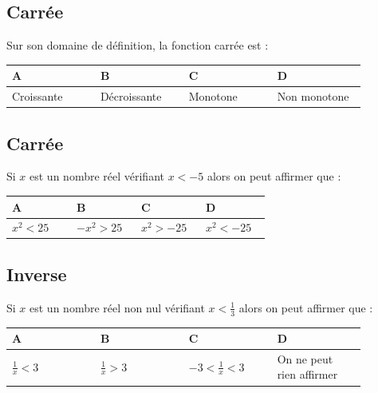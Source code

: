\documentclass[oneside,12pt]{article}
\begin{document}
\subsection{Carrée}
Sur son domaine de définition, la fonction carrée est :

\begin{center}
	\renewcommand{\arraystretch}{1.35}
	\begin{tabular}{| P{0.22\linewidth} | P{0.22\linewidth} | P{0.22\linewidth} | P{0.22\linewidth} |} \hline
	A & B & C & D \\ \hline
	Croissante & Décroissante & Monotone & Non monotone \\ \hline
	\end{tabular}
\end{center}



\subsection{Carrée}
Si $x$ est un nombre réel vérifiant $x < -5$ alors on peut affirmer que :

\begin{center}
	\renewcommand{\arraystretch}{1.35}
	\begin{tabular}{| P{0.22\linewidth} | P{0.22\linewidth} | P{0.22\linewidth} | P{0.22\linewidth} |} \hline
	A & B & C & D \\ \hline
	\rule{0pt}{5mm}
	$x^2 < 25$ & $- x^2 > 25$ & $x^2 > -25$ & $ x^2 < -25$ \\ \hline
	\end{tabular}
\end{center}



\subsection{Inverse}
Si $x$ est un nombre réel non nul vérifiant $x < \frac{1}{3}$ alors on peut affirmer que :

\begin{center}
	\renewcommand{\arraystretch}{1.35}
	\begin{tabular}{| P{0.22\linewidth} | P{0.22\linewidth} | P{0.22\linewidth} | P{0.22\linewidth} |} \hline
	A & B & C & D \\ \hline
	\vspace*{-5pt} $\frac{1}{x} < 3$ & \vspace*{-5pt} $\frac{1}{x} > 3 $ & \vspace*{-5pt} $-3 < \frac{1}{x} < 3$ & On ne peut rien affirmer \\ \hline
	\end{tabular}
\end{center}
\end{document}
